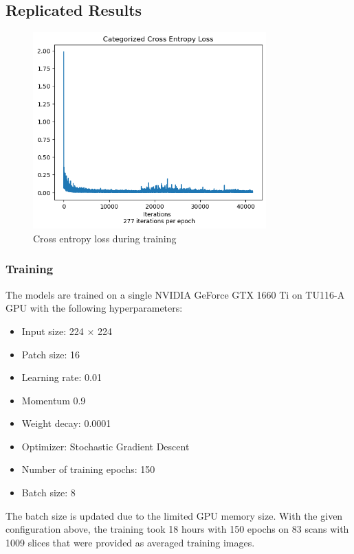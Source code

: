 \documentclass{IEEEtran}
\begin{document}
\subsection{Replicated Results}

\begin{figure}[h]
\centering
\includegraphics[width=0.8\textwidth]{img/celoss.png}
\caption{Cross entropy loss during training}\label{fig:celoss}
\end{figure}

\subsubsection{Training}
The models are trained on a single NVIDIA GeForce GTX 1660 Ti on TU116-A GPU
with the following hyperparameters:
\begin{itemize}
    \item Input size: 224 $\times$ 224
    \item Patch size: 16
    \item Learning rate: 0.01
    \item Momentum 0.9 
    \item Weight decay: 0.0001
    \item Optimizer: Stochastic Gradient Descent
    \item Number of training epochs: 150
    \item Batch size: 8
\end{itemize} 
The batch size is updated due to the limited GPU memory size. With the given configuration above, the training took 18 hours with 150 epochs on 83 scans with 1009 slices that were provided as averaged training images. 
\end{document}
